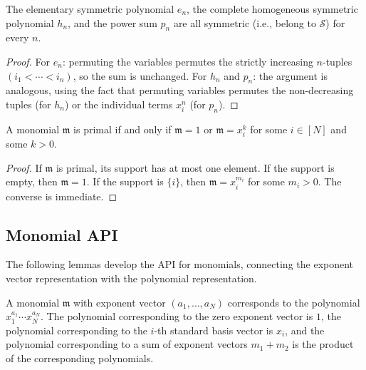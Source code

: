 \begin{lemma}
\label{lem.sf.e-isSymm}
\leanhelper
\leanok
The elementary symmetric polynomial $e_n$, the complete homogeneous symmetric
polynomial $h_n$, and the power sum $p_n$ are all symmetric (i.e., belong to
$\mathcal{S}$) for every $n$.
\end{lemma}

\begin{proof}
\leanok
For $e_n$: permuting the variables permutes the strictly increasing
$n$-tuples $(i_1 < \cdots < i_n)$, so the sum is unchanged.
For $h_n$ and $p_n$: the argument is analogous, using the fact that
permuting variables permutes the non-decreasing tuples (for $h_n$)
or the individual terms $x_i^n$ (for $p_n$).
\end{proof}

\begin{lemma}
\label{lem.sf.monomial-isPrimal-iff}
\leanhelper
\leanok
A monomial $\mathfrak{m}$ is primal if and only if $\mathfrak{m} = 1$
or $\mathfrak{m} = x_i^k$ for some $i \in [N]$ and some $k > 0$.
\end{lemma}

\begin{proof}
\leanok
If $\mathfrak{m}$ is primal, its support has at most one element.
If the support is empty, then $\mathfrak{m} = 1$.
If the support is $\{i\}$, then $\mathfrak{m} = x_i^{m_i}$ for some $m_i > 0$.
The converse is immediate.
\end{proof}

\subsection{Monomial API}

The following lemmas develop the API for monomials, connecting the exponent vector
representation with the polynomial representation.

\begin{lemma}
\label{lem.sf.monomial-toPoly}
\leanhelper
\leanok
A monomial $\mathfrak{m}$ with exponent vector $(a_1, \ldots, a_N)$ corresponds to the
polynomial $x_1^{a_1} \cdots x_N^{a_N}$.
The polynomial corresponding to the zero exponent vector is $1$,
the polynomial corresponding to the $i$-th standard basis vector is $x_i$,
and the polynomial corresponding to a sum of exponent vectors $m_1 + m_2$ is
the product of the corresponding polynomials.
\end{lemma}

